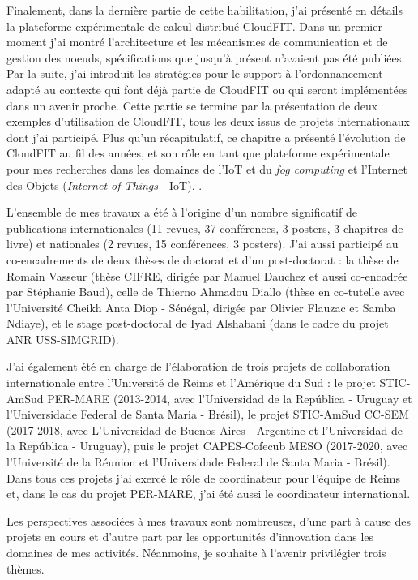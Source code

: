 Finalement, dans la dernière partie de cette habilitation, j'ai présenté en détails la plateforme expérimentale de calcul distribué CloudFIT. Dans un premier moment j'ai montré l'architecture et les mécanismes de communication et de gestion des n{oe}uds, spécifications que jusqu'à présent n'avaient pas été publiées. Par la suite, j'ai introduit les stratégies pour le support à l'ordonnancement adapté au contexte qui font déjà partie de CloudFIT ou qui seront implémentées dans un avenir proche. Cette partie se termine par la présentation de deux exemples d'utilisation de CloudFIT, tous les deux issus de projets internationaux dont j'ai participé. Plus qu'un récapitulatif, ce chapitre a présenté l'évolution de  CloudFIT au fil des années, et son rôle en tant que plateforme expérimentale pour mes recherches dans les domaines de l'IoT et du  \textit{fog computing} et l'Internet des Objets (\textit{Internet of Things} - IoT). .

L'ensemble de mes travaux a été à l'origine d'un nombre significatif de publications internationales (11 revues, 37 conférences, 3 posters, 3 chapitres de livre) et nationales (2 revues, 15 conférences, 3 posters). J'ai aussi participé au co-encadrements de deux thèses de doctorat et d'un post-doctorat : la thèse de Romain Vasseur (thèse CIFRE, dirigée par Manuel Dauchez et aussi co-encadrée par Stéphanie Baud), celle de Thierno Ahmadou Diallo (thèse en co-tutelle avec l'Université Cheikh Anta Diop - Sénégal, dirigée par Olivier Flauzac et Samba Ndiaye), et le stage post-doctoral de Iyad Alshabani (dans le cadre du projet ANR USS-SIMGRID). 

J'ai également été en charge de l'élaboration de trois projets de collaboration internationale entre l'Université de Reims et l'Amérique du Sud : le projet STIC-AmSud PER-MARE (2013-2014, avec l'Universidad de la República - Uruguay et l'Universidade Federal de Santa Maria - Brésil), le projet STIC-AmSud CC-SEM (2017-2018, avec L'Universidad de Buenos Aires - Argentine et l'Universidad de la República - Uruguay), puis le projet CAPES-Cofecub MESO (2017-2020, avec l'Université de la Réunion et  l'Universidade Federal de Santa Maria - Brésil). Dans tous ces projets j'ai exercé le rôle de coordinateur pour l'équipe de Reims et, dans le cas du projet PER-MARE, j'ai été aussi le coordinateur international.

Les perspectives associées à mes travaux sont nombreuses, d'une part à cause des projets en cours et d'autre part par les opportunités d'innovation dans les domaines de mes activités. Néanmoins, je souhaite à l'avenir privilégier trois thèmes.


